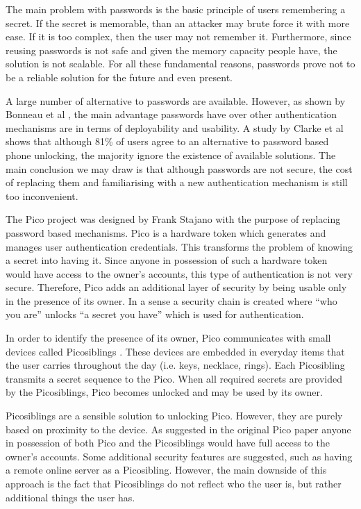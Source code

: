 The main problem with passwords is the basic principle of users remembering a secret. If the secret is memorable, than an attacker may brute force it with more ease. If it is too complex, then the user may not remember it. Furthermore, since reusing passwords is not safe and given the memory capacity people have, the solution is not scalable. For all these fundamental reasons, passwords prove not to be a reliable solution for the future and even present.

A large number of alternative to passwords are available. However, as shown by Bonneau et al \cite{bonneau2012quest}, the main advantage passwords have over other authentication mechanisms are in terms of deployability and usability. A study by Clarke et al \cite{clarke2002acceptance} shows that although 81\% of users agree to an alternative to password based phone unlocking, the majority ignore the existence of available solutions. The main conclusion we may draw is that although passwords are not secure, the cost of replacing them and familiarising with a new authentication mechanism is still too inconvenient. 

The Pico project was designed by Frank Stajano \cite{stajano2011pico} with the purpose of replacing password based mechanisms. Pico is a hardware token which generates and manages user authentication credentials. This transforms the problem of knowing a secret into having it. Since anyone in possession of such a hardware token would have access to the owner's accounts, this type of authentication is not very secure. Therefore, Pico adds an additional layer of security by being usable only in the presence of its owner. In a sense a security chain is created where ``who you are'' unlocks ``a secret you have'' which is used for authentication.

In order to identify the presence of its owner, Pico communicates with small devices called Picosiblings \cite{stannard2012good}. These devices are embedded in everyday items that the user carries throughout the day (i.e. keys, necklace, rings). Each Picosibling transmits a secret sequence to the Pico. When all required secrets are provided by the Picosiblings, Pico becomes unlocked and may be used by its owner.

Picosiblings are a sensible solution to unlocking Pico. However, they are purely based on proximity to the device. As suggested in the original Pico paper \cite{stajano2011pico} anyone in possession of both Pico and the Picosiblings would have full access to the owner's accounts. Some additional security features are suggested, such as having a remote online server as a Picosibling. However, the main downside of this approach is the fact that Picosiblings do not reflect who the user is, but rather additional things the user has.

